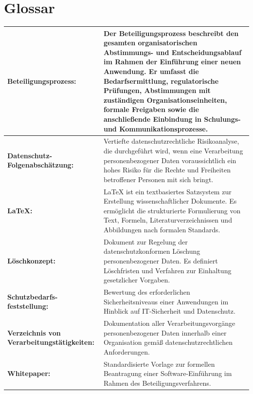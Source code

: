 \documentclass[
    12pt, 
    a4paper,
    ]{scrartcl} %
\begin{document}
\section*{Glossar}  
{} 
\vspace{0.6cm}
\begin{tabular}{p{4cm} p{11.35cm}}   
    \textbf{\normalsize Beteiligungsprozess:} & \normalsize Der Beteiligungsprozess beschreibt den gesamten organisatorischen Abstimmungs- und Entscheidungsablauf im Rahmen der Einführung einer neuen Anwendung. Er umfasst die Bedarfsermittlung, regulatorische Prüfungen, Abstimmungen mit zuständigen Organisationseinheiten, formale Freigaben sowie die anschließende Einbindung in Schulungs- und Kommunikationsprozesse.\footnotemark[30]\\[0.5cm]
    \hline
    \textbf{\normalsize Datenschutz-Folgenabschätzung:} & \normalsize Vertiefte datenschutzrechtliche Risikoanalyse, die durchgeführt wird, wenn eine Verarbeitung personenbezogener Daten voraussichtlich ein hohes Risiko für die Rechte und Freiheiten betroffener Personen mit sich bringt.\footnotemark[31]\\[0.5cm]
    \hline
    \textbf{\normalsize LaTeX:} & \normalsize LaTeX ist ein textbasiertes Satzsystem zur Erstellung wissenschaftlicher Dokumente. Es ermöglicht die strukturierte Formulierung von Text, Formeln, Literaturverzeichnissen und Abbildungen nach formalen Standards.\footnotemark[32]\\[0.5cm]
    \hline
    \textbf{\normalsize Löschkonzept:} & \normalsize Dokument zur Regelung der datenschutzkonformen Löschung personenbezogener Daten. Es definiert Löschfristen und Verfahren zur Einhaltung gesetzlicher Vorgaben.\footnotemark[34]\\[0.5cm]
    \hline
    \textbf{\normalsize Schutzbedarfs-feststellung:} & \normalsize Bewertung des erforderlichen Sicherheitsniveaus einer Anwendungen im Hinblick auf IT-Sicherheit und Datenschutz.\footnotemark[35]\\[0.5cm]
    \hline
    \textbf{\normalsize Verzeichnis von Verarbeitungstätigkeiten:} & \normalsize Dokumentation aller Verarbeitungsvorgänge personenbezogener Daten innerhalb einer Organisation gemäß datenschutzrechtlichen Anforderungen.\footnotemark[36]\\[0.5cm]
    \hline
    \textbf{\normalsize Whitepaper:} & \normalsize Standardisierte Vorlage zur formellen Beantragung einer Software-Einführung im Rahmen des Beteiligungsverfahrens.\footnotemark[37]\\[0.5cm]

\end{tabular}
\end{document}
